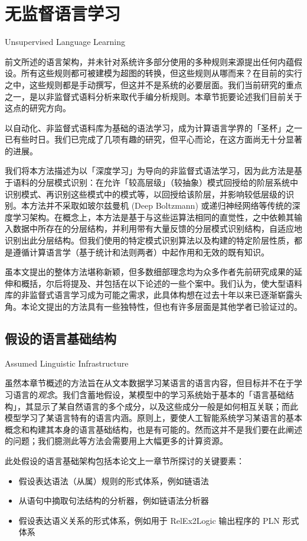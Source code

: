 \chapter{无监督语言学习}{Unsupervised Language Learning}
\label{chap:unsupervised}

前文所述的语言架构，并未针对系统许多部分使用的多种规则来源提出任何内蕴假设。所有这些规则都可被建模为超图的转换，但这些规则从哪而来？在目前的实行之中，这些规则都是手动撰写，但这并不是系统的必要层面。我们当前研究的重点之一，是以非监督式语料分析来取代手编分析规则。本章节扼要论述我们目前关于这点的研究方向。 

以自动化、非监督式语料库为基础的语法学习，成为计算语言学界的「圣杯」之一已有些时日\cite{Klein2003}。我们已完成了几项有趣的研究，但平心而论，在这方面尚无十分显著的进展。

我们将本方法描述为以「深度学习」为导向的非监督式语法学习，因为此方法是基于语料的分层模式识别：在允许「较高层级」（较抽象）模式回授给的阶层系统中识别模式、再识别这些模式中的模式等，以回授给该阶层，并影响较低层级的识别。本方法并不采取如玻尔兹曼机 (Deep Boltzmann) 或递归神经网络等传统的深度学习架构。在概念上，本方法是基于与这些运算法相同的直觉性，之中依赖其输入数据中所存在的分层结构，并利用带有大量反馈的分层模式识别结构，自适应地识别出此分层结构。但我们使用的特定模式识别算法以及构建的特定阶层性质，都是遵循计算语言学（基于统计和法则两者）中起作用和无效的既有知识。 

虽本文提出的整体方法堪称新颖，但多数细部理念均为众多作者先前研究成果的延伸和概括，尔后将提及、并包括在以下论述的一些个案中。我们认为，使大型语料库的非监督式语言学习成为可能之需求，此具体构想在过去十年以来已逐渐崭露头角。本论文提出的方法具有一些独特性，但也有许多层面是其他学者已验证过的。

\section{假设的语言基础结构}{Assumed Linguistic Infrastructure}

虽然本章节概述的方法旨在从文本数据学习某语言的语言内容，但目标并不在于学习语言的\textit{观念}。我们含蓄地假设，某模型中的学习系统始于基本的「语言基础结构」，其显示了某自然语言的多个成分，以及这些成分一般是如何相互关联；而此模型学习了某语言特有的语言内涵。原则上，要使人工智能系统学习某语言的基本概念和构建其本身的语言基础结构，也是有可能的。然而这并不是我们要在此阐述的问题；我们臆测此等方法会需要用上大幅更多的计算资源。 

此处假设的语言基础架构包括本论文上一章节所探讨的关键要素：
\begin{itemize}
\item 假设表达语法（从属）规则的形式体系，例如链语法
\item 从语句中摘取句法结构的分析器，例如链语法分析器
\item 假设表达语义关系的形式体系，例如用于 RelEx2Logic 输出程序的 PLN 形式体系
\end{itemize}

